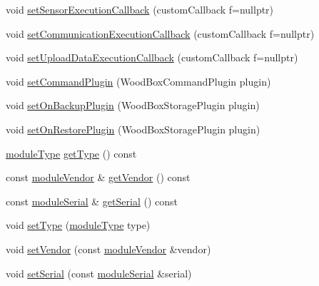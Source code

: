 \begin{DoxyCompactItemize}
\item 
void \mbox{\hyperlink{classwood_box_1_1module_1_1_wood_box_module_ab04481aafdcb9f3ff5ac9c9567f06006}{set\+Sensor\+Execution\+Callback}} (custom\+Callback f=nullptr)
\item 
void \mbox{\hyperlink{classwood_box_1_1module_1_1_wood_box_module_af75fdaa122bfa637b3c0273a699adaef}{set\+Communication\+Execution\+Callback}} (custom\+Callback f=nullptr)
\item 
void \mbox{\hyperlink{classwood_box_1_1module_1_1_wood_box_module_a1912f897cb51233fdfeb061211dee3d2}{set\+Upload\+Data\+Execution\+Callback}} (custom\+Callback f=nullptr)
\item 
void \mbox{\hyperlink{classwood_box_1_1module_1_1_wood_box_module_ad40df0835ac2ffcec83cfb96d12f9079}{set\+Command\+Plugin}} (Wood\+Box\+Command\+Plugin plugin)
\item 
void \mbox{\hyperlink{classwood_box_1_1module_1_1_wood_box_module_a94cfcf71ecd1d715d14752001fbc7b6a}{set\+On\+Backup\+Plugin}} (Wood\+Box\+Storage\+Plugin plugin)
\item 
void \mbox{\hyperlink{classwood_box_1_1module_1_1_wood_box_module_a85d4efff4708d41e3097479ab364faac}{set\+On\+Restore\+Plugin}} (Wood\+Box\+Storage\+Plugin plugin)
\item 
\mbox{\hyperlink{classwood_box_1_1module_1_1_wood_box_module_af74476c8a785de7fe587c4fb68435673}{module\+Type}} \mbox{\hyperlink{classwood_box_1_1module_1_1_wood_box_module_ab2507312ea013ea5c95b8e1731ddc81d}{get\+Type}} () const
\item 
const \mbox{\hyperlink{classwood_box_1_1module_1_1_wood_box_module_adf5d59bae2980ff138284d0fa885df19}{module\+Vendor}} \& \mbox{\hyperlink{classwood_box_1_1module_1_1_wood_box_module_a2d3f18ce3df3d5fe3b6230fce2199958}{get\+Vendor}} () const
\item 
const \mbox{\hyperlink{classwood_box_1_1module_1_1_wood_box_module_a3a6503bbd5147a06ba50081f97177b46}{module\+Serial}} \& \mbox{\hyperlink{classwood_box_1_1module_1_1_wood_box_module_aa8fc11fbebc7904f144bc40b7654a215}{get\+Serial}} () const
\item 
void \mbox{\hyperlink{classwood_box_1_1module_1_1_wood_box_module_a807efbd90ccdd796bfc62c15bfbc81ab}{set\+Type}} (\mbox{\hyperlink{classwood_box_1_1module_1_1_wood_box_module_af74476c8a785de7fe587c4fb68435673}{module\+Type}} type)
\item 
void \mbox{\hyperlink{classwood_box_1_1module_1_1_wood_box_module_af19696ed5702e009a584065892ed1501}{set\+Vendor}} (const \mbox{\hyperlink{classwood_box_1_1module_1_1_wood_box_module_adf5d59bae2980ff138284d0fa885df19}{module\+Vendor}} \&vendor)
\item 
void \mbox{\hyperlink{classwood_box_1_1module_1_1_wood_box_module_affcbb54be4585637a88aade3e29b8a93}{set\+Serial}} (const \mbox{\hyperlink{classwood_box_1_1module_1_1_wood_box_module_a3a6503bbd5147a06ba50081f97177b46}{module\+Serial}} \&serial)
\end{DoxyCompactItemize}
